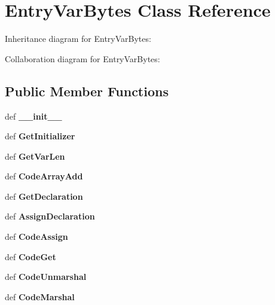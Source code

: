\section{\-Entry\-Var\-Bytes \-Class \-Reference}
\label{classevent__rpcgen_1_1_entry_var_bytes}


\-Inheritance diagram for \-Entry\-Var\-Bytes\-:


\-Collaboration diagram for \-Entry\-Var\-Bytes\-:
\subsection*{\-Public \-Member \-Functions}
\begin{DoxyCompactItemize}
\item 
def {\bfseries \-\_\-\-\_\-init\-\_\-\-\_\-}\label{classevent__rpcgen_1_1_entry_var_bytes_ac775ee34451fdfa742b318538164070e}

\item 
def {\bfseries \-Get\-Initializer}\label{classevent__rpcgen_1_1_entry_var_bytes_acc967744885bfbdf0f0aeed27c888d23}

\item 
def {\bfseries \-Get\-Var\-Len}\label{classevent__rpcgen_1_1_entry_var_bytes_a08d14096a163fb84ee8c3536eab2ff47}

\item 
def {\bfseries \-Code\-Array\-Add}\label{classevent__rpcgen_1_1_entry_var_bytes_a1f454357f69d9ec15f1a68c95d0e0326}

\item 
def {\bfseries \-Get\-Declaration}\label{classevent__rpcgen_1_1_entry_var_bytes_a466f7ed549f8de6974add96c9ebf1d09}

\item 
def {\bfseries \-Assign\-Declaration}\label{classevent__rpcgen_1_1_entry_var_bytes_a415190be3c5f4dde7128f492d38a2196}

\item 
def {\bfseries \-Code\-Assign}\label{classevent__rpcgen_1_1_entry_var_bytes_a6b6a08cd00ffadb276d29fcbf0dc3bfc}

\item 
def {\bfseries \-Code\-Get}\label{classevent__rpcgen_1_1_entry_var_bytes_ac4f27f4fd487ba8b17807758ea0b5234}

\item 
def {\bfseries \-Code\-Unmarshal}\label{classevent__rpcgen_1_1_entry_var_bytes_a4f7edbd130c034cfa9d24b7be679f8af}

\item 
def {\bfseries \-Code\-Marshal}\label{classevent__rpcgen_1_1_entry_var_bytes_ae994601ffc7e740cede6cb32d6d4f55a}


\end{DoxyCompactItemize}
